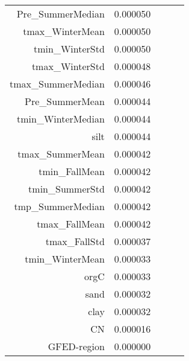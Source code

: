 \begin{tabular}{rrrrr}
Pre_SummerMedian & 0.000050 \\
tmax_WinterMean & 0.000050 \\
tmin_WinterStd & 0.000050 \\
tmax_WinterStd & 0.000048 \\
tmax_SummerMedian & 0.000046 \\
Pre_SummerMean & 0.000044 \\
tmin_WinterMedian & 0.000044 \\
silt & 0.000044 \\
tmax_SummerMean & 0.000042 \\
tmin_FallMean & 0.000042 \\
tmin_SummerStd & 0.000042 \\
tmp_SummerMedian & 0.000042 \\
tmax_FallMean & 0.000042 \\
tmax_FallStd & 0.000037 \\
tmin_WinterMean & 0.000033 \\
orgC & 0.000033 \\
sand & 0.000032 \\
clay & 0.000032 \\
CN & 0.000016 \\
GFED-region & 0.000000 \\
\bottomrule
\end{tabular}
